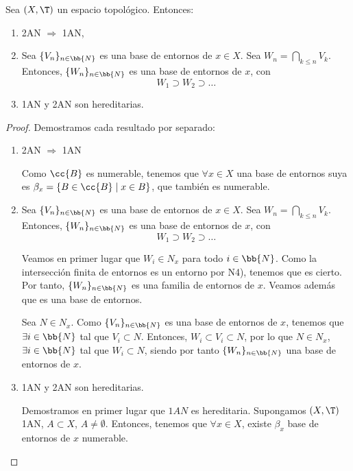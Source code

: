 \begin{prop}
    Sea $(X,\T)$ un espacio topológico. Entonces:
    \begin{enumerate}
        \item 2AN $\Longrightarrow$ 1AN,
        \item Sea $\{V_n\}_{n\in \bb{N}}$ es una base de entornos de $x\in X$. Sea $W_n = \bigcap\limits_{k\leq n}V_k$. Entonces, $\{W_n\}_{n\in \bb{N}}$ es una base de entornos de $x$, con
        $$W_1\supset W_2\supset \dots$$
        
        \item 1AN y 2AN son hereditarias.
    \end{enumerate}
\end{prop}
\begin{proof} Demostramos cada resultado por separado:
    \begin{enumerate}
        \item 2AN $\Longrightarrow$ 1AN
    
        Como $\cc{B}$ es numerable, tenemos que $\forall x\in X$ una base de entornos suya es $\beta_x=\{B\in \cc{B}\mid x\in B\}$, que también es numerable.
    
        \item Sea $\{V_n\}_{n\in \bb{N}}$ es una base de entornos de $x\in X$. Sea $W_n = \bigcap\limits_{k\leq n}V_k$. Entonces, $\{W_n\}_{n\in \bb{N}}$ es una base de entornos de $x$, con
        $$W_1\supset W_2\supset \dots$$

        Veamos en primer lugar que $W_i\in N_x$ para todo $i\in \bb{N}$. Como la intersección finita de entornos es un entorno por N4), tenemos que es cierto. Por tanto, $\{W_n\}_{n\in \bb{N}}$ es una familia de entornos de $x$. Veamos además que es una base de entornos.
        
        Sea $N\in N_x$. Como $\{V_n\}_{n\in \bb{N}}$ es una base de entornos de $x$, tenemos que $\exists i\in \bb{N}$ tal que $V_i\subset N$. Entonces, $W_i\subset V_i\subset N$, por lo que $N\in N_x$, $\exists i\in \bb{N}$ tal que $W_i\subset N$, siendo por tanto $\{W_n\}_{n\in \bb{N}}$ una base de entornos de $x$.
    
        \item 1AN y 2AN son hereditarias.

        Demostramos en primer lugar que $1AN$ es hereditaria. Supongamos $(X,\T)$ 1AN, $A\subset X$, $A\neq \emptyset$. Entonces, tenemos que $\forall x\in X$, existe $\beta_x$ base de entornos de $x$ numerable.


\end{enumerate}
\end{proof}
